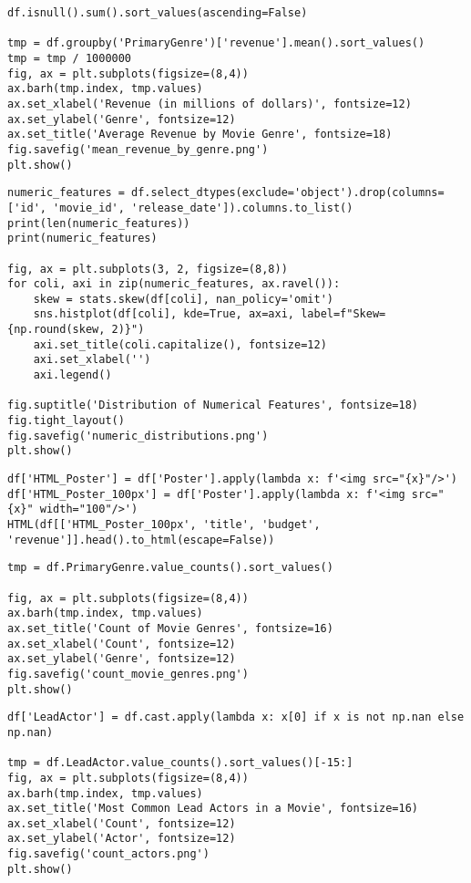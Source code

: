 \begin{lstlisting}
df.isnull().sum().sort_values(ascending=False)

tmp = df.groupby('PrimaryGenre')['revenue'].mean().sort_values()
tmp = tmp / 1000000
fig, ax = plt.subplots(figsize=(8,4))
ax.barh(tmp.index, tmp.values)
ax.set_xlabel('Revenue (in millions of dollars)', fontsize=12)
ax.set_ylabel('Genre', fontsize=12)
ax.set_title('Average Revenue by Movie Genre', fontsize=18)
fig.savefig('mean_revenue_by_genre.png')
plt.show()
\end{lstlisting}

\begin{lstlisting}
numeric_features = df.select_dtypes(exclude='object').drop(columns=['id', 'movie_id', 'release_date']).columns.to_list()
print(len(numeric_features))
print(numeric_features)

fig, ax = plt.subplots(3, 2, figsize=(8,8))
for coli, axi in zip(numeric_features, ax.ravel()):
    skew = stats.skew(df[coli], nan_policy='omit')
    sns.histplot(df[coli], kde=True, ax=axi, label=f"Skew= {np.round(skew, 2)}")
    axi.set_title(coli.capitalize(), fontsize=12)
    axi.set_xlabel('')
    axi.legend()
    
fig.suptitle('Distribution of Numerical Features', fontsize=18)
fig.tight_layout()
fig.savefig('numeric_distributions.png')
plt.show()
\end{lstlisting}

\begin{lstlisting}
df['HTML_Poster'] = df['Poster'].apply(lambda x: f'<img src="{x}"/>')
df['HTML_Poster_100px'] = df['Poster'].apply(lambda x: f'<img src="{x}" width="100"/>')
HTML(df[['HTML_Poster_100px', 'title', 'budget', 'revenue']].head().to_html(escape=False))
\end{lstlisting}

\begin{lstlisting}
tmp = df.PrimaryGenre.value_counts().sort_values()

fig, ax = plt.subplots(figsize=(8,4))
ax.barh(tmp.index, tmp.values)
ax.set_title('Count of Movie Genres', fontsize=16)
ax.set_xlabel('Count', fontsize=12)
ax.set_ylabel('Genre', fontsize=12)
fig.savefig('count_movie_genres.png')
plt.show()
\end{lstlisting}

\begin{lstlisting}
df['LeadActor'] = df.cast.apply(lambda x: x[0] if x is not np.nan else np.nan)

tmp = df.LeadActor.value_counts().sort_values()[-15:]
fig, ax = plt.subplots(figsize=(8,4))
ax.barh(tmp.index, tmp.values)
ax.set_title('Most Common Lead Actors in a Movie', fontsize=16)
ax.set_xlabel('Count', fontsize=12)
ax.set_ylabel('Actor', fontsize=12)
fig.savefig('count_actors.png')
plt.show()
\end{lstlisting}

